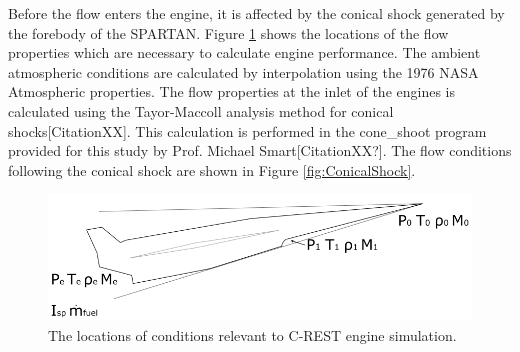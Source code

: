 Before the flow enters the engine, it is affected by the conical shock generated by the forebody of the SPARTAN.
Figure \ref{fig:SPARTANEngineshock} shows the locations of the flow properties which are necessary to calculate engine performance. The ambient atmospheric conditions are calculated by interpolation using the 1976 NASA Atmospheric properties\cite{Administration1976}.
The flow properties at the inlet of the engines is calculated using the Tayor-Maccoll analysis method for conical shocks[CitationXX]. This calculation is performed in the cone\_shoot program provided for this study by Prof. Michael Smart[CitationXX?]. The flow conditions following the conical shock are shown in Figure \ref{fig:ConicalShock}.  

\begin{figure}[ht]
\centering
\includegraphics[width=0.7\linewidth]{figures/3_vehicle_design/SPARTANEngineshock}
\caption{The locations of conditions relevant to C-REST engine simulation. }
\label{fig:SPARTANEngineshock}
\end{figure}


